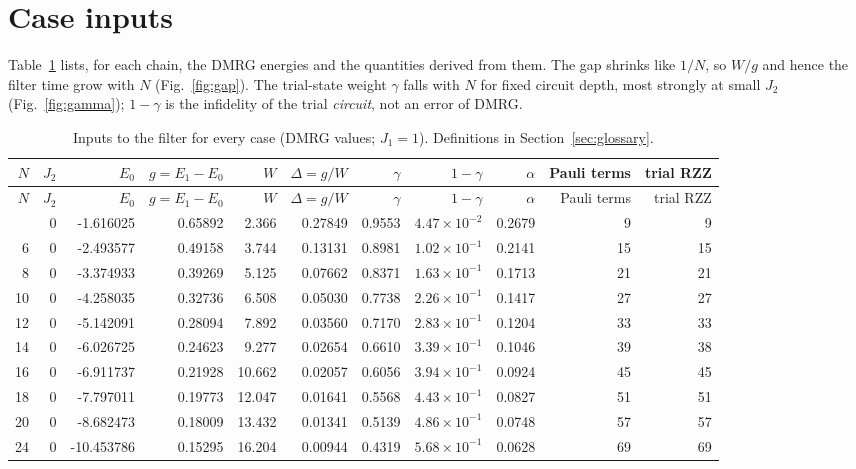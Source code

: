 \documentclass[11pt]{article}
\begin{document}
\section{Case inputs}\label{sec:inputs}
Table~\ref{tab:inputs} lists, for each chain, the DMRG energies and the quantities derived from them. The gap shrinks like $1/N$, so $W/g$ and hence the filter time grow with $N$ (Fig.~\ref{fig:gap}). The trial-state weight $\gamma$ falls with $N$ for fixed circuit depth, most strongly at small $J_2$ (Fig.~\ref{fig:gamma}); $1-\gamma$ is the infidelity of the trial \emph{circuit}, not an error of DMRG.
{\small
\begin{longtable}{rrrrrrrrrrr}
\caption{Inputs to the filter for every case (DMRG values; $J_1=1$). Definitions in Section~\ref{sec:glossary}.}\label{tab:inputs}\\
\toprule
$N$ & $J_2$ & $E_0$ & $g=E_1-E_0$ & $W$ & $\Delta=g/W$ & $\gamma$ & $1-\gamma$ & $\alpha$ & Pauli terms & trial RZZ \\
\midrule
\endfirsthead
\toprule
$N$ & $J_2$ & $E_0$ & $g=E_1-E_0$ & $W$ & $\Delta=g/W$ & $\gamma$ & $1-\gamma$ & $\alpha$ & Pauli terms & trial RZZ \\
\midrule
\endhead
\bottomrule
\endfoot
4 & 0 & -1.616025 & 0.65892 & 2.366 & 0.27849 & 0.9553 & $4.47\times10^{-2}$ & 0.2679 & 9 & 9 \\
6 & 0 & -2.493577 & 0.49158 & 3.744 & 0.13131 & 0.8981 & $1.02\times10^{-1}$ & 0.2141 & 15 & 15 \\
8 & 0 & -3.374933 & 0.39269 & 5.125 & 0.07662 & 0.8371 & $1.63\times10^{-1}$ & 0.1713 & 21 & 21 \\
10 & 0 & -4.258035 & 0.32736 & 6.508 & 0.05030 & 0.7738 & $2.26\times10^{-1}$ & 0.1417 & 27 & 27 \\
12 & 0 & -5.142091 & 0.28094 & 7.892 & 0.03560 & 0.7170 & $2.83\times10^{-1}$ & 0.1204 & 33 & 33 \\
14 & 0 & -6.026725 & 0.24623 & 9.277 & 0.02654 & 0.6610 & $3.39\times10^{-1}$ & 0.1046 & 39 & 38 \\
16 & 0 & -6.911737 & 0.21928 & 10.662 & 0.02057 & 0.6056 & $3.94\times10^{-1}$ & 0.0924 & 45 & 45 \\
18 & 0 & -7.797011 & 0.19773 & 12.047 & 0.01641 & 0.5568 & $4.43\times10^{-1}$ & 0.0827 & 51 & 51 \\
20 & 0 & -8.682473 & 0.18009 & 13.432 & 0.01341 & 0.5139 & $4.86\times10^{-1}$ & 0.0748 & 57 & 57 \\
24 & 0 & -10.453786 & 0.15295 & 16.204 & 0.00944 & 0.4319 & $5.68\times10^{-1}$ & 0.0628 & 69 & 69 \\

\end{longtable}}
\end{document}

